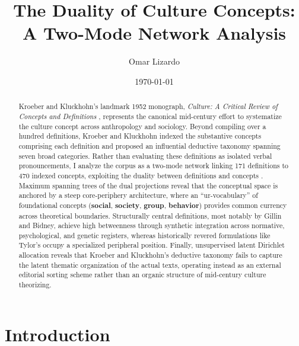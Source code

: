 \documentclass[11pt]{article}
\title{The Duality of Culture Concepts: A Two-Mode Network Analysis}
\author{Omar Lizardo}
\date{\today}
\begin{document}
\maketitle

\begin{abstract}
Kroeber and Kluckhohn's landmark 1952 monograph, \emph{Culture: A Critical Review of Concepts and Definitions} \citep{kroeberkluckhohn1952}, represents the canonical mid-century effort to systematize the culture concept across anthropology and sociology. Beyond compiling over a hundred definitions, Kroeber and Kluckhohn indexed the substantive concepts comprising each definition and proposed an influential deductive taxonomy spanning seven broad categories. Rather than evaluating these definitions as isolated verbal pronouncements, I analyze the corpus as a two-mode network linking 171 definitions to 470 indexed concepts, exploiting the duality between definitions and concepts \citep{breiger1974}. Maximum spanning trees of the dual projections reveal that the conceptual space is anchored by a steep core-periphery architecture, where an ``ur-vocabulary'' of foundational concepts (\textbf{social}, \textbf{society}, \textbf{group}, \textbf{behavior}) provides common currency across theoretical boundaries. Structurally central definitions, most notably by Gillin and Bidney, achieve high betweenness through synthetic integration across normative, psychological, and genetic registers, whereas historically revered formulations like Tylor's occupy a specialized peripheral position. Finally, unsupervised latent Dirichlet allocation reveals that Kroeber and Kluckhohn's deductive taxonomy fails to capture the latent thematic organization of the actual texts, operating instead as an external editorial sorting scheme rather than an organic structure of mid-century culture theorizing.
\end{abstract}

\section{Introduction}
\end{document}
